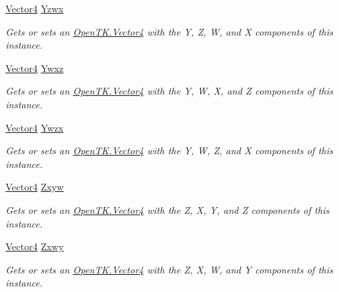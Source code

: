 \begin{DoxyCompactItemize}
\hyperlink{struct_open_t_k_1_1_vector4}{Vector4} \hyperlink{struct_open_t_k_1_1_vector4_a42fc147dd892f3f91c979e685c25365d}{Yzwx}
\begin{DoxyCompactList}\small\item\em Gets or sets an \hyperlink{struct_open_t_k_1_1_vector4}{Open\-T\-K.\-Vector4} with the Y, Z, W, and X components of this instance. \end{DoxyCompactList}\item 
\hyperlink{struct_open_t_k_1_1_vector4}{Vector4} \hyperlink{struct_open_t_k_1_1_vector4_a41c594a8f8c007dd321a0240c185b14d}{Ywxz}
\begin{DoxyCompactList}\small\item\em Gets or sets an \hyperlink{struct_open_t_k_1_1_vector4}{Open\-T\-K.\-Vector4} with the Y, W, X, and Z components of this instance. \end{DoxyCompactList}\item 
\hyperlink{struct_open_t_k_1_1_vector4}{Vector4} \hyperlink{struct_open_t_k_1_1_vector4_aa25d25b27d3a2744686becfb16e7e39d}{Ywzx}
\begin{DoxyCompactList}\small\item\em Gets or sets an \hyperlink{struct_open_t_k_1_1_vector4}{Open\-T\-K.\-Vector4} with the Y, W, Z, and X components of this instance. \end{DoxyCompactList}\item 
\hyperlink{struct_open_t_k_1_1_vector4}{Vector4} \hyperlink{struct_open_t_k_1_1_vector4_a80d1e072767fc736ab04ff48bafb3ed5}{Zxyw}
\begin{DoxyCompactList}\small\item\em Gets or sets an \hyperlink{struct_open_t_k_1_1_vector4}{Open\-T\-K.\-Vector4} with the Z, X, Y, and Z components of this instance. \end{DoxyCompactList}\item 
\hyperlink{struct_open_t_k_1_1_vector4}{Vector4} \hyperlink{struct_open_t_k_1_1_vector4_a1321eb94f6330f0ebb95b94a637894da}{Zxwy}
\begin{DoxyCompactList}\small\item\em Gets or sets an \hyperlink{struct_open_t_k_1_1_vector4}{Open\-T\-K.\-Vector4} with the Z, X, W, and Y components of this instance. \end{DoxyCompactList}\item 

\end{DoxyCompactItemize}
